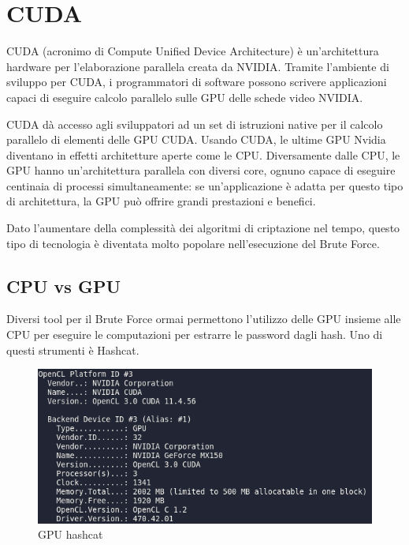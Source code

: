 \chapter{CUDA}

CUDA\cite{hendarto2017performance} (acronimo di Compute Unified Device Architecture) è un'architettura hardware per l'elaborazione parallela creata da NVIDIA. Tramite l'ambiente di sviluppo per CUDA, i programmatori di software possono scrivere applicazioni capaci di eseguire calcolo parallelo sulle GPU delle schede video NVIDIA.

CUDA dà accesso agli sviluppatori ad un set di istruzioni native per il calcolo parallelo di elementi delle GPU CUDA. Usando CUDA, le ultime GPU Nvidia diventano in effetti architetture aperte come le CPU. Diversamente dalle CPU, le GPU hanno un'architettura parallela con diversi core, ognuno capace di eseguire centinaia di processi simultaneamente: se un'applicazione è adatta per questo tipo di architettura, la GPU può offrire grandi prestazioni e benefici.

Dato l'aumentare della complessità dei algoritmi di criptazione nel tempo, questo tipo di tecnologia è diventata molto popolare nell'esecuzione del Brute Force. 

\section{CPU vs GPU}

Diversi tool per il Brute Force ormai permettono l'utilizzo delle GPU insieme alle CPU per eseguire le computazioni per estrarre le password dagli hash. Uno di questi strumenti è Hashcat.

\begin{figure}[ht]
    \centering
    \includegraphics[width=\linewidth]{Immagini/7/GPU_hashcat.png}
    \caption{GPU hashcat}
\end{figure}

